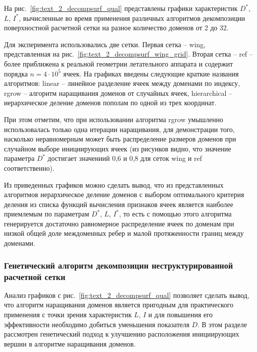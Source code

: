 На рис.~\ref{fig:text_2_decompsurf_qual} представлены графики характеристик $D^{*}$, $L$, $I^{*}$, вычисленные во время применения различных алгоритмов декомпозиции поверхностной расчетной сетки на разное количество доменов от 2 до 32.

Для эксперимента использовались две сетки.
Первая сетка -- wing, представленная на рис.~\ref{fig:text_2_decompsurf_wing_grid}.
Вторая сетка -- ref -- более приближена к реальной геометрии летательного аппарата и содержит порядка $n = 4 \cdot 10^5$ ячеек.
На графиках введены следующие краткие названия алгоритмов: linear -- линейное разделение ячеек между доменами по индексу, rgrow -- алгоритм наращивания доменов от случайных ячеек, hierarchical -- иерархическое деление доменов пополам по одной из трех координат.

При этом отметим, что при использовании алгоритма rgrow умышленно использовалась только одна итерации наращивания, для демонстрации того, насколько неравномерным может быть распределение размеров доменов при случайном выборе инициирующих ячеек (из рисунков видно, что значение параметра $D^{*}$ достигает значениий 0,6 и 0,8 для сеток wing и ref соответственно).

Из приведенных графиков можно сделать вывод, что из представленных алгоритмов иерархическое деление доменов с выбором оптимального критерия деления из списка функций вычисления признаков ячеек является наиболее приемлемым по параметрам $D^{*}$, $L$, $I^{*}$, то есть с помощью этого алгоритма генерируется достаточно равномерное распределение ячеек по доменам при низкой общей доле междоменных ребер и малой протяженности границ между доменами.

\subsubsection{Генетический алгоритм декомпозиции неструктурированной расчетной сетки}\label{sec:text_2_genetic}

Анализ графиков с рис.~\ref{fig:text_2_decompsurf_qual} позволяет сделать вывод, что алгоритм наращивания доменов является пригодным для практического применения с точки зрения характеристик $L$, $I$ и для повышения его эффективности необходимо добиться уменьшения показателя $D$.
В этом разделе рассмотрен генетический подход к улучшению расположения инициирующих вершин в алгоритме наращивания доменов.

